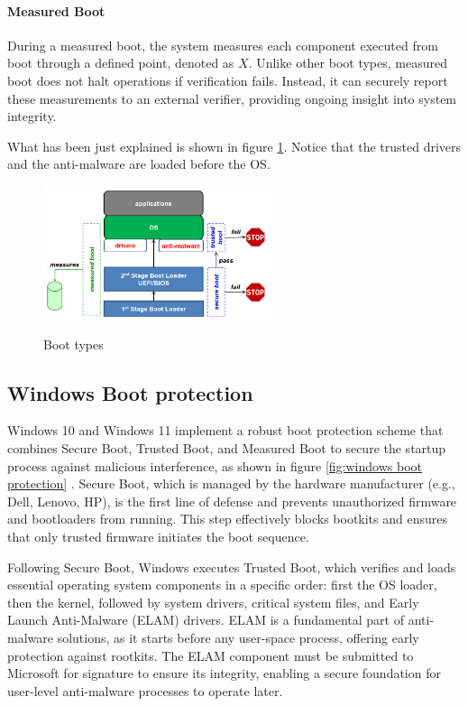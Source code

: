 \paragraph{Measured Boot} During a measured boot, the system 
measures each component executed from boot through a defined 
point, denoted as \(X\). Unlike other boot types, measured boot 
does not halt operations if verification fails. Instead, it can securely 
report these measurements to an external verifier, providing 
ongoing insight into system integrity.

What has been just explained is shown in figure \ref{fig:boot types}.
Notice that the trusted drivers and the anti-malware are loaded before
the OS.
\begin{figure}[H]
  \centering
  \includegraphics[width=0.6\textwidth]{img/boot types.png}
  \label{fig:boot types}
  \caption{Boot types}
\end{figure}

\subsection*{Windows Boot protection}

Windows 10 and Windows 11 implement a robust boot protection scheme
that combines Secure Boot, Trusted Boot, and Measured Boot to secure
the startup process against malicious interference, as shown in figure
\ref{fig:windows boot protection} . Secure Boot, which is managed by
the hardware manufacturer (e.g., Dell, Lenovo, HP), is the first line
of defense and prevents unauthorized firmware and bootloaders from
running. This step effectively blocks bootkits and ensures that only
trusted firmware initiates the boot sequence.

Following Secure Boot, Windows executes Trusted Boot, which verifies
and loads essential operating system components in a specific order:
first the OS loader, then the kernel, followed by system drivers,
critical system files, and Early Launch Anti-Malware (ELAM) drivers.
ELAM is a fundamental part of anti-malware solutions, as it starts
before any user-space process, offering early protection against
rootkits. The ELAM component must be submitted to Microsoft for
signature to ensure its integrity, enabling a secure foundation for
user-level anti-malware processes to operate later.

